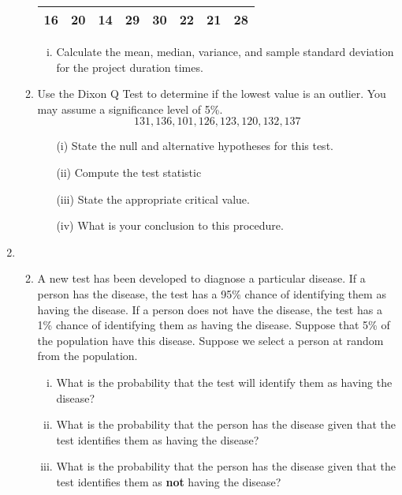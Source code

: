 \documentclass[a4paper,12pt]{article}
\begin{document}
\begin{enumerate}
\begin{enumerate}
\begin{table}[ht]
\begin{tabular}{|rrrrrrrr|}
		16 &  20 &  14 &  29 &  30 &  22 &  21 &  28 \\ 
		\hline
	\end{tabular}
\end{table}	


\begin{enumerate}[(i)]
	\item  Calculate the mean, median, variance, and sample standard deviation for the project duration times.
\end{enumerate}

 \hspace{\fill}%
\item 
Use the Dixon Q Test to determine if the lowest value is an outlier. You may assume a significance level of 5\%.
\[ 131, 136, 101, 126, 123, 120, 132, 137\]
\begin{itemize}
	\item[(i)]	State the null and alternative hypotheses for this test.
	\item[(ii)] Compute the test statistic
	\item[(iii)] State the appropriate critical value.
	\item[(iv)] What is your conclusion to this procedure.
\end{itemize}	

\end{enumerate}




\item 
\begin{enumerate}

\medskip
\noindent Use statistical tables to determine the probabilities for the above exercises. You are required to show all of your workings.
\item[] 

\item A new test has been developed to diagnose a particular disease. If a person has the disease, the test has a 95\% chance of identifying them as having the disease. 
If a person does not have the disease, the test has a 1\% chance of identifying them as having the disease. Suppose that 5\% of the population have this disease. Suppose we select a person at random from the population.


\begin{enumerate}[(i)]
	\item  What is the probability that the test will identify them as having the disease?
	
	\item  What is the probability that the person has the disease given that the test identifies them as having the disease?
	\item  What is the probability that the person has the disease given that the test identifies them as \textbf{not} having the disease?
\end{enumerate}



\end{enumerate}
\end{enumerate}
\end{document}
